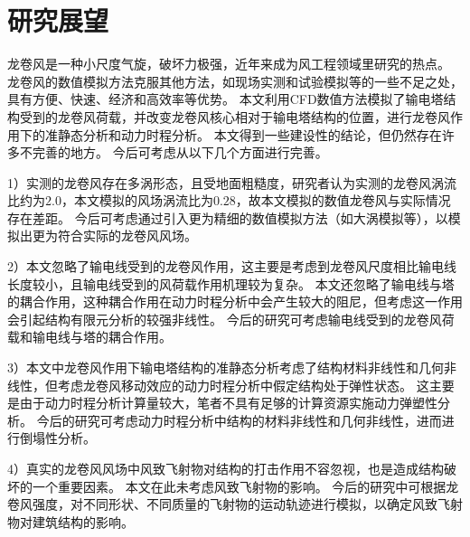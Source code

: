 \section{研究展望}

龙卷风是一种小尺度气旋，破坏力极强，近年来成为风工程领域里研究的热点。
龙卷风的数值模拟方法克服其他方法，如现场实测和试验模拟等的一些不足之处，具有方便、快速、经济和高效率等优势。
本文利用CFD数值方法模拟了输电塔结构受到的龙卷风荷载，并改变龙卷风核心相对于输电塔结构的位置，进行龙卷风作用下的准静态分析和动力时程分析。
本文得到一些建设性的结论，但仍然存在许多不完善的地方。
今后可考虑从以下几个方面进行完善。

1）实测的龙卷风存在多涡形态，且受地面粗糙度，研究者认为实测的龙卷风涡流比约为$2.0$，本文模拟的风场涡流比为$0.28$，故本文模拟的数值龙卷风与实际情况存在差距。
今后可考虑通过引入更为精细的数值模拟方法（如大涡模拟等），以模拟出更为符合实际的龙卷风风场。

2）本文忽略了输电线受到的龙卷风作用，这主要是考虑到龙卷风尺度相比输电线长度较小，且输电线受到的风荷载作用机理较为复杂。
本文还忽略了输电线与塔的耦合作用，这种耦合作用在动力时程分析中会产生较大的阻尼，但考虑这一作用会引起结构有限元分析的较强非线性。
今后的研究可考虑输电线受到的龙卷风荷载和输电线与塔的耦合作用。

3）本文中龙卷风作用下输电塔结构的准静态分析考虑了结构材料非线性和几何非线性，但考虑龙卷风移动效应的动力时程分析中假定结构处于弹性状态。
这主要是由于动力时程分析计算量较大，笔者不具有足够的计算资源实施动力弹塑性分析。
今后的研究可考虑动力时程分析中结构的材料非线性和几何非线性，进而进行倒塌性分析。

4）真实的龙卷风风场中风致飞射物对结构的打击作用不容忽视，也是造成结构破坏的一个重要因素。
本文在此未考虑风致飞射物的影响。
今后的研究中可根据龙卷风强度，对不同形状、不同质量的飞射物的运动轨迹进行模拟，以确定风致飞射物对建筑结构的影响。


